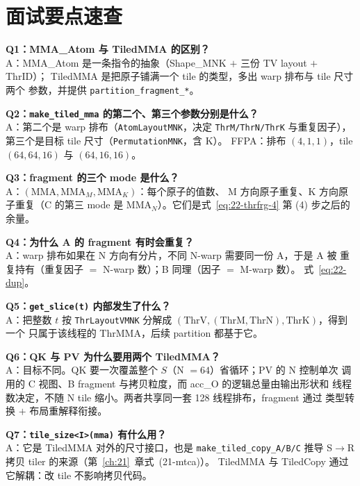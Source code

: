 \section{面试要点速查}

\textbf{Q1：MMA\_Atom 与 TiledMMA 的区别？}\\
A：MMA\_Atom 是一条指令的抽象（Shape\_MNK $+$ 三份 TV layout $+$ ThrID）；
TiledMMA 是把原子铺满一个 tile 的类型，多出 warp 排布与 tile 尺寸两个
参数，并提供 \texttt{partition\_\allowbreak{}fragment\_\allowbreak{}*}。

\textbf{Q2：\texttt{make\_\allowbreak{}tiled\_\allowbreak{}mma} 的第二个、第三个参数分别是什么？}\\
A：第二个是 warp 排布（\texttt{Atom\allowbreak{}Layout\allowbreak{}MNK}，决定 \texttt{Thr\allowbreak{}M/\allowbreak{}Thr\allowbreak{}N/\allowbreak{}Thr\allowbreak{}K}
与重复因子），第三个是目标 tile 尺寸（\texttt{Permutation\allowbreak{}MNK}，含 K）。
FFPA：排布 $(4,1,1)$，tile $(64,64,16)$ 与 $(64,16,16)$。

\textbf{Q3：fragment 的三个 mode 是什么？}\\
A：$(\mathrm{MMA}, \mathrm{MMA}_M, \mathrm{MMA}_K)$：每个原子的值数、
M 方向原子重复、K 方向原子重复（C 的第三 mode 是
$\mathrm{MMA}_N$）。它们是式~\eqref{eq:22-thrfrg-4} 第 (4) 步之后的余量。

\textbf{Q4：为什么 A 的 fragment 有时会重复？}\\
A：warp 排布如果在 N 方向有分片，不同 N-warp 需要同一份 A，于是 A 被
重复持有（重复因子 $=$ N-warp 数）；B 同理（因子 $=$ M-warp 数）。
式~\eqref{eq:22-dup}。

\textbf{Q5：\texttt{get\_\allowbreak{}slice\allowbreak{}(t)} 内部发生了什么？}\\
A：把整数 $t$ 按 \texttt{Thr\allowbreak{}Layout\allowbreak{}VMNK} 分解成
$(\mathrm{ThrV},(\mathrm{ThrM},\mathrm{ThrN}),\mathrm{ThrK})$，得到一个
只属于该线程的 ThrMMA，后续 partition 都基于它。

\textbf{Q6：QK 与 PV 为什么要用两个 TiledMMA？}\\
A：目标不同。QK 要一次覆盖整个 $S$（N $=64$）省循环；PV 的 N 控制单次
调用的 C 视图、B fragment 与拷贝粒度，而 acc\_O 的逻辑总量由输出形状和
线程数决定，不随 N tile 缩小。两者共享同一套 128 线程排布，fragment 通过
类型转换 $+$ 布局重解释衔接。

\textbf{Q7：\texttt{tile\_\allowbreak{}size\allowbreak{}<I>\allowbreak{}(mma)} 有什么用？}\\
A：它是 TiledMMA 对外的尺寸接口，也是 \texttt{make\_\allowbreak{}tiled\_\allowbreak{}copy\_\allowbreak{}A/\allowbreak{}B/\allowbreak{}C}
推导 S$\to$R 拷贝 tiler 的来源（第~\ref{ch:21}~章式~(21-mtca)）。
TiledMMA 与 TiledCopy 通过它解耦：改 tile 不影响拷贝代码。

